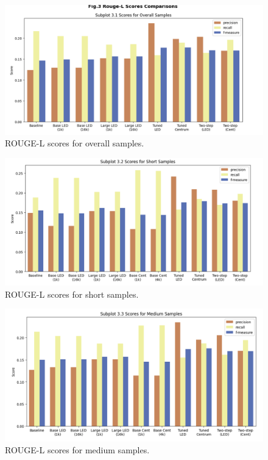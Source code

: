 \documentclass[12pt, twocolumn]{article}
\numberwithin{equation}{section}
\begin{document}
\begin{figure}
    \includegraphics[width=\textwidth]{overall.png}
    \caption{ROUGE-L scores for overall samples.}
    \label{fig:overall}
\end{figure}

\begin{figure}
    \includegraphics[width=\textwidth]{short.png}
    \caption{ROUGE-L scores for short samples.}
    \label{fig:short}
\end{figure}

\begin{figure}
    \includegraphics[width=\textwidth]{medium.png}
    \caption{ROUGE-L scores for medium samples.}
    \label{fig:medium}
\end{figure}
\end{document}
